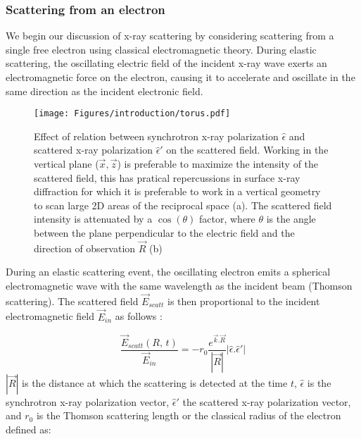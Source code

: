 \subsubsection{Scattering from an electron}

We begin our discussion of x-ray scattering by considering scattering from a single free electron using classical electromagnetic theory.
During elastic scattering, the oscillating electric field of the incident x-ray wave exerts an electromagnetic force on the electron, causing it to accelerate and oscillate in the same direction as the incident electronic field.

\begin{figure}[!htb]
    \centering
    \texttt{[image: Figures/introduction/torus.pdf]}
    \caption{
        Effect of relation between synchrotron x-ray polarization $\hat{\epsilon}$ and scattered x-ray polarization $\hat{\epsilon}'$ on the scattered field.
        Working in the vertical plane ($\vec{x}, \vec{z}$) is preferable to maximize the intensity of the scattered field, this has pratical repercussions in surface x-ray diffraction for which it is preferable to work in a vertical geometry to scan large 2D areas of the reciprocal space (a).
        The scattered field intensity is attenuated by a $\cos{(\theta)}$ factor, where $\theta$ is the angle between the plane perpendicular to the electric field and the direction of observation $\vec{R}$ (b)
    }
    \label{fig:polarization_effect}
\end{figure}

During an elastic scattering event, the oscillating electron emits a spherical electromagnetic wave with the same wavelength as the incident beam (Thomson scattering).
The scattered field $\vec{E}_{scatt}$ is then proportional to the incident electromagnetic field $\vec{E}_{in}$ as follows \parencite{NielsenMcMorrow}:

\begin{equation}
    \label{eq:scatt_field}
    \frac{\vec{E}_{scatt}(R, \, t)} {\vec{E}_{in}} = -r_0 \frac{e^{\vec{k}.\vec{R}}} {|\vec{R}|}| \hat{\epsilon}.\hat{\epsilon}'|
\end{equation}
$|\vec{R}|$ is the distance at which the scattering is detected at the time $t$, $\hat{\epsilon}$ is the synchrotron x-ray polarization vector, $\hat{\epsilon}'$ the scattered x-ray polarization vector, and $r_0$ is the Thomson scattering length or the classical radius of the electron defined as:

